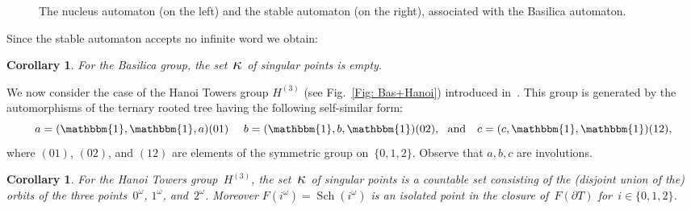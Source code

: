 \documentclass{amsart}
\newtheorem{corollary}[theorem]{Corollary}
\begin{document}
\begin{figure}[h!]
\begin{center}
		\end{center}
		\caption{The nucleus automaton  (on the left) and the stable automaton (on the right), associated with the Basilica automaton.} \label{fig: automaton N}
\end{figure}

Since the stable automaton accepts no infinite word we obtain:

\begin{corollary}
For the Basilica group, the set~${\hbox{\Large{$\kappa$}}}$ of singular points is empty.
\end{corollary}

We now consider the case of the Hanoi Towers group $H^{(3)}$ (see Fig.~\ref{Fig: Bas+Hanoi}) introduced in~\cite{GriSu06}.
This group is generated by the automorphisms of the ternary rooted tree having the following self-similar form:
$$
a= (\operatorname{\mathbbm{1}},\operatorname{\mathbbm{1}},a)(01) \ \ \ \ b=(\operatorname{\mathbbm{1}},b,\operatorname{\mathbbm{1}})(02), \ \ \hbox{and}  \ \ \ c=(c,\operatorname{\mathbbm{1}},\operatorname{\mathbbm{1}})(12),
$$
where $(01)$, $(02)$, and $(12)$ are elements of the symmetric group on~$\{0,1,2\}$. Observe that $a,b,c$ are involutions. 

\begin{corollary}\label{theo: hanoi}
For the Hanoi Towers group~$H^{(3)}$, the set~${\hbox{\Large{$\kappa$}}}$ of singular points is a countable set consisting of the (disjoint union of the) orbits of the three points~$0^{\omega}$, $1^{\omega}$, and~$2^{\omega}$. Moreover $F(i^{\omega})=\operatorname{Sch}(i^{\omega})$ is an isolated point in the closure of~$F(\partial T)$ for~$i\in\{0,1,2\}$.
\end{corollary}
\end{document}
